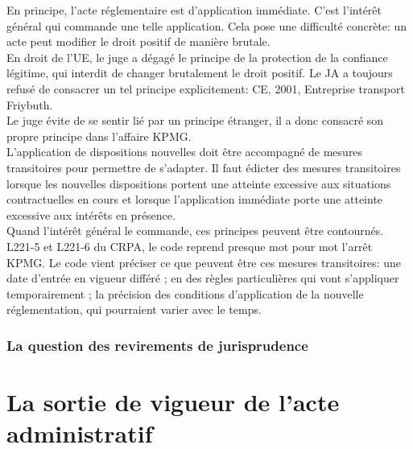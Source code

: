 \documentclass[10pt, a4paper, openany]{book}
\begin{document}
En principe, l'acte réglementaire est d'application immédiate. C'est l'intérêt général qui commande une telle application. Cela pose une difficulté concrète: un acte peut modifier le droit positif de manière brutale. \\
En droit de l'UE, le juge a dégagé le principe de la protection de la confiance légitime, qui interdit de changer brutalement le droit positif. Le JA a toujours refusé de consacrer un tel principe explicitement: CE, 2001, Entreprise transport Friybuth. \\
Le juge évite de se sentir lié par un principe étranger, il a donc consacré son propre principe dans l'affaire KPMG. \\
L'application de dispositions nouvelles doit être accompagné de mesures transitoires pour permettre de s'adapter. Il faut édicter des mesures transitoires lorsque les nouvelles dispositions portent une atteinte excessive aux situations contractuelles en cours et lorsque l'application immédiate porte une atteinte excessive aux intérêts en présence. \\
Quand l'intérêt général le commande, ces principes peuvent être contournés. \\
L221-5 et L221-6 du CRPA, le code reprend presque mot pour mot l'arrêt KPMG. Le code vient préciser ce que peuvent être ces mesures transitoires: une date d'entrée en vigueur différé ; en des règles particulières qui vont s'appliquer temporairement ; la précision des conditions d'application de la nouvelle réglementation, qui pourraient varier avec le temps. 

\subsubsection{La question des revirements de jurisprudence}








\section{La sortie de vigueur de l'acte administratif}
\end{document}

